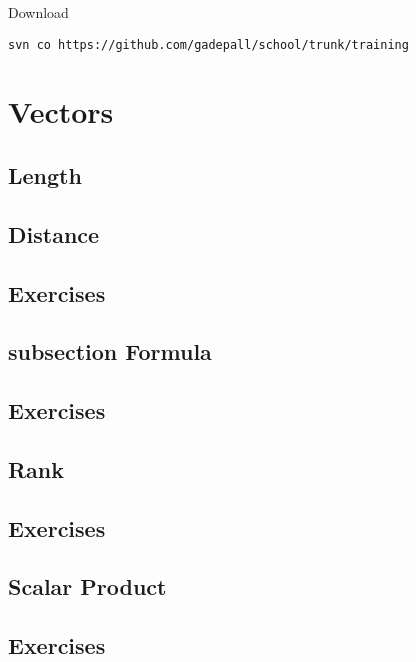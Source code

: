 \documentclass[journal,12pt,onecolumn]{IEEEtran}
\begin{document}
\begin{abstract}
This manual includes \LaTeX figures.
\end{abstract}
Download 
\begin{lstlisting}
svn co https://github.com/gadepall/school/trunk/training
\end{lstlisting}
\section{Vectors}
\subsection{Length}

\subsection{Distance}

\subsection{Exercises}

\subsection{subsection Formula}

\subsection{Exercises}

\subsection{Rank}

\subsection{Exercises}

\subsection{Scalar Product}

\subsection{Exercises}

\end{document}
